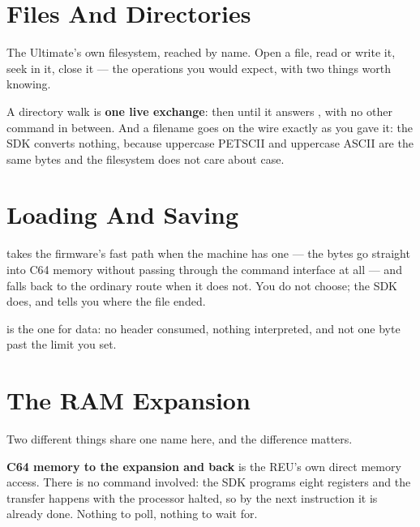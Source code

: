 

\section{Files And Directories}

The Ultimate's own filesystem, reached by name. Open a file, read or write it,
seek in it, close it --- the operations you would expect, with two things worth
knowing.

A directory walk is \textbf{one live exchange}:  then
 until it answers , with no other
command in between. And a filename goes on the wire exactly as you gave it: the
SDK converts nothing, because uppercase PETSCII and uppercase ASCII are the
same bytes and the filesystem does not care about case.

\section{Loading And Saving}

 takes the firmware's fast path when the machine has one
--- the bytes go straight into C64 memory without passing through the command
interface at all --- and falls back to the ordinary route when it does not. You
do not choose; the SDK does, and tells you where the file ended.

 is the one for data: no header consumed, nothing
interpreted, and not one byte past the limit you set.

\section{The RAM Expansion}

Two different things share one name here, and the difference matters.

\textbf{C64 memory to the expansion and back} is the REU's own direct memory
access. There is no command involved: the SDK programs eight registers and the
transfer happens with the processor halted, so by the next instruction it is
already done. Nothing to poll, nothing to wait for.

